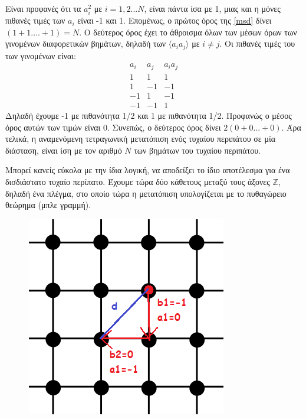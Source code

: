 Είναι προφανές ότι τα $a_i^2$ με $i=1,2...N$, είναι πάντα ίσα με 1, μιας και η μόνες πιθανές τιμές των $a_i$ είναι -1 και 1. Επομένως, ο πρώτος όρος της \eqref{msd} δίνει $(1+1....+1) = Ν$. Ο δεύτερος όρος έχει το άθροισμα όλων των μέσων όρων των γινομένων διαφορετικών βημάτων, δηλαδή των $\langle a_i a_j \rangle$ με $i\neq j$.
Οι πιθανές τιμές του των γινομένων είναι:
\begin{equation}
\begin{array}{rcc}
a_{i} & a_{j} & a_{i} a_{j} \\
1 & 1 & 1 \\
1 & -1 & -1 \\
-1 & 1 & -1 \\
-1 & -1 & 1
\end{array}
\end{equation}
Δηλαδή έχουμε -1 με πιθανότητα 1/2 και 1 με πιθανότητα 1/2. Προφανώς ο μέσος όρος αυτών των τιμών είναι 0. Συνεπώς, ο δεύτερος όρος δίνει $2(0+0...+0)$. Άρα τελικά, η αναμενόμενη τετραγωνική μετατόπιση ενός τυχαίου περιπάτου σε μία διάσταση, είναι ίση με τον αριθμό $Ν$ των βημάτων του τυχαίου περιπάτου.

Μπορεί κανείς εύκολα με την ίδια λογική, να αποδείξει το ίδιο αποτέλεσμα για ένα δισδιάστατο τυχαίο περίπατο. Έχουμε τώρα δύο κάθετους μεταξύ τους άξονες $\mathbb{Z}$, δηλαδή ένα πλέγμα, στο οποίο τώρα η μετατόπιση υπολογίζεται με το πυθαγώρειο θεώρημα (μπλε γραμμή).

\begin{figure}[H]
\begin{center}
\includegraphics[scale=1.1]{figures/TheoryRW3.png}
\end{center}
\end{figure}

